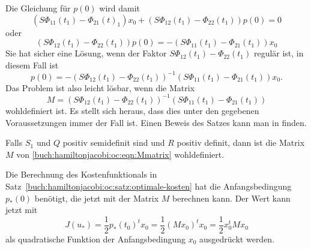 Die Gleichung für $p(0)$ wird damit
\[
(S\Phi_{11}(t_1)
-\Phi_{21}(t)_1)x_0
+
(S\Phi_{12}(t_1)
-\Phi_{22}(t_1))p(0)
=
0
\]
oder
\[
(S\Phi_{12}(t_1)
-\Phi_{22}(t_1))
p(0)
=
-
(S\Phi_{11}(t_1)
-\Phi_{21}(t_1))
x_0
\]
Sie hat sicher eine Lösung, wenn der Faktor $S\Phi_{12}(t_1)-\Phi_{22}(t_1)$
regulär ist, in diesem Fall ist
\[
p(0)
=
-
(S\Phi_{12}(t_1)
-\Phi_{22}(t_1))^{-1}
(S\Phi_{11}(t_1)
-\Phi_{21}(t_1))
x_0.
\]
Das Problem ist also leicht lösbar, wenn die Matrix
\begin{equation}
M
=
(S\Phi_{12}(t_1)
-\Phi_{22}(t_1))^{-1}
(S\Phi_{11}(t_1)
-\Phi_{21}(t_1))
\label{buch:hamiltonjacobi:oc:eqn:Mmatrix}
\end{equation}
wohldefiniert ist.
Es stellt sich heraus, dass dies unter den gegebenen Voraussetzungen
immer der Fall ist.
Einen Beweis des Satzes kann man in \cite[chapter 4]{buch:control} finden.

\begin{satz}
Falls $S_1$ und $Q$ positiv semidefinit sind und $R$ positiv definit,
dann ist die Matrix $M$ von
\eqref{buch:hamiltonjacobi:oc:eqn:Mmatrix}
wohldefiniert.
\end{satz}


Die Berechnung des Kostenfunktionals in
Satz~\ref{buch:hamiltonjacobi:oc:satz:optimale-kosten}
hat die Anfangsbedingung $p_*(0)$ benötigt, die jetzt mit der
Matrix $M$ berechnen kann.
Der Wert kann jetzt mit
\[
J(u_*)
=
\frac12 p_*(t_0)^t x_0
=
\frac12 (Mx_0)^t x_0
=
\frac12 x_0^t Mx_0
\]
als quadratische Funktion der Anfangsbedingung $x_0$ ausgedrückt werden.


